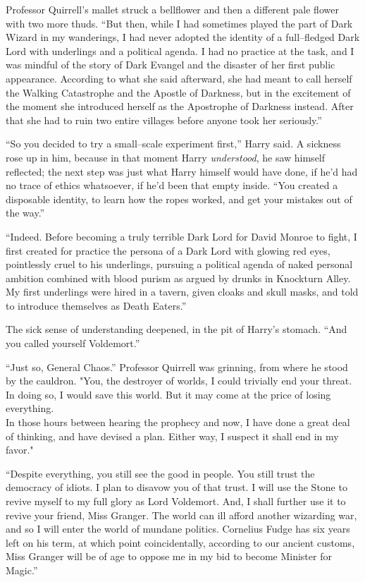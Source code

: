 Professor Quirrell’s mallet struck a bellflower and then a different pale flower with two more thuds. “But then, while I had sometimes played the part of Dark Wizard in my wanderings, I had never adopted the identity of a full\mbox{--}fledged Dark Lord with underlings and a political agenda. I had no practice at the task, and I was mindful of the story of Dark Evangel and the disaster of her first public appearance. According to what she said afterward, she had meant to call herself the Walking Catastrophe and the Apostle of Darkness, but in the excitement of the moment she introduced herself as the Apostrophe of Darkness instead. After that she had to ruin two entire villages before anyone took her seriously.”

“So you decided to try a small\mbox{--}scale experiment first,” Harry said. A sickness rose up in him, because in that moment Harry \emph{understood}, he saw himself reflected; the next step was just what Harry himself would have done, if he’d had no trace of ethics whatsoever, if he’d been that empty inside. “You created a disposable identity, to learn how the ropes worked, and get your mistakes out of the way.”

“Indeed. Before becoming a truly terrible Dark Lord for David Monroe to fight, I first created for practice the persona of a Dark Lord with glowing red eyes, pointlessly cruel to his underlings, pursuing a political agenda of naked personal ambition combined with blood purism as argued by drunks in Knockturn Alley. My first underlings were hired in a tavern, given cloaks and skull masks, and told to introduce themselves as Death Eaters.”

The sick sense of understanding deepened, in the pit of Harry’s stomach. “And you called yourself Voldemort.”

“Just so, General Chaos.” Professor Quirrell was grinning, from where he stood by the cauldron. "You, the destroyer of worlds, I could trivially end your threat. In doing so, I would save this world. But it may come at the price of losing everything.\\In those hours between hearing the prophecy and now, I have done a great deal of thinking, and have devised a plan. Either way, I suspect it shall end in my favor."

“Despite everything, you still see the good in people. You still trust the democracy of idiots. I plan to disavow you of that trust. I will use the Stone to revive myself to my full glory as Lord Voldemort. And, I shall further use it to revive your friend, Miss Granger. The world can ill afford another wizarding war, and so I will enter the world of mundane politics. Cornelius Fudge has six years left on his term, at which point coincidentally, according to our ancient customs, Miss Granger will be of age to oppose me in my bid to become Minister for Magic.”

